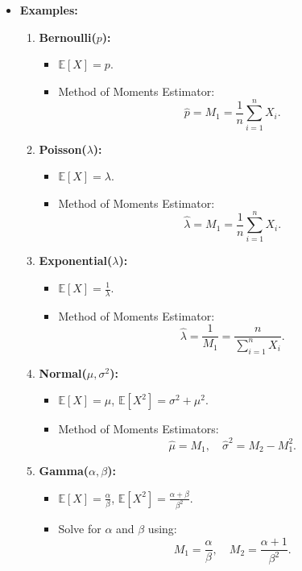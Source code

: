 \documentclass{article}
\begin{document}
\begin{itemize}
  \item \textbf{Examples:}
    \begin{enumerate}
      \item \textbf{Bernoulli($p$):}
        \begin{itemize}
          \item $\mathbb{E}[X] = p$.
          \item Method of Moments Estimator:
            \[
              \hat{p} = M_1 = \frac{1}{n} \sum_{i=1}^n X_i.
            \]
        \end{itemize}

      \item \textbf{Poisson($\lambda$):}
        \begin{itemize}
          \item $\mathbb{E}[X] = \lambda$.
          \item Method of Moments Estimator:
            \[
              \hat{\lambda} = M_1 = \frac{1}{n} \sum_{i=1}^n X_i.
            \]
        \end{itemize}

      \item \textbf{Exponential($\lambda$):}
        \begin{itemize}
          \item $\mathbb{E}[X] = \frac{1}{\lambda}$.
          \item Method of Moments Estimator:
            \[
              \hat{\lambda} = \frac{1}{M_1} = \frac{n}{\sum_{i=1}^n X_i}.
            \]
        \end{itemize}

      \item \textbf{Normal($\mu, \sigma^2$):}
        \begin{itemize}
          \item $\mathbb{E}[X] = \mu$, $\mathbb{E}[X^2] = \sigma^2 + \mu^2$.
          \item Method of Moments Estimators:
            \[
              \hat{\mu} = M_1, \quad \hat{\sigma}^2 = M_2 - M_1^2.
            \]
        \end{itemize}

      \item \textbf{Gamma($\alpha, \beta$):}
        \begin{itemize}
          \item $\mathbb{E}[X] = \frac{\alpha}{\beta}$, $\mathbb{E}[X^2] = \frac{\alpha + \beta}{\beta^2}$.
          \item Solve for $\alpha$ and $\beta$ using:
            \[
              M_1 = \frac{\alpha}{\beta}, \quad M_2 = \frac{\alpha + 1}{\beta^2}.
            \]
        \end{itemize}
    \end{enumerate}


\end{itemize}
\end{document}
